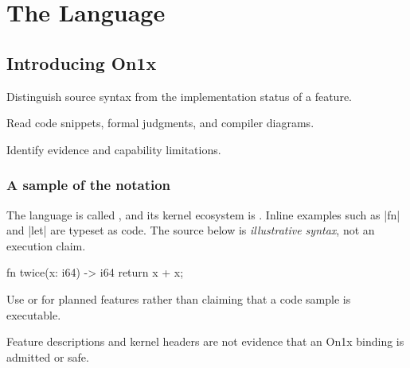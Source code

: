 \documentclass[11pt,twoside,openany,full]{on1x-book}
\begin{document}
\frontmatter
\maketitle
{}
\OnxContents
\mainmatter
\part{The Language}
\chapter{Introducing On1x}\label{ch:intro}
\begin{OnxObjectives}
\item Distinguish source syntax from the implementation status of a feature.
\item Read code snippets, formal judgments, and compiler diagrams.
\item Identify evidence and capability limitations.
\end{OnxObjectives}
\section{A sample of the notation}
The language is called \OnxLanguage{}, and its kernel ecosystem is \OnxMuLIB{}.
Inline examples such as \OnxInline|fn| and \OnxInline|let| are typeset as code.
The source below is \emph{illustrative syntax}, not an execution claim.
\begin{OnxCodeBlock}[caption={Illustrative function syntax},label={lst:first}]
fn twice(x: i64) -> i64 {
    return x + x;
}
\end{OnxCodeBlock}
\begin{OnxNote}
Use \OnxPartial{} or \OnxAbsent{} for planned features rather than claiming that a code sample is executable.
\end{OnxNote}
\begin{OnxWarning}
Feature descriptions and kernel headers are not evidence that an On1x binding is admitted or safe.
\end{OnxWarning}
\end{document}
